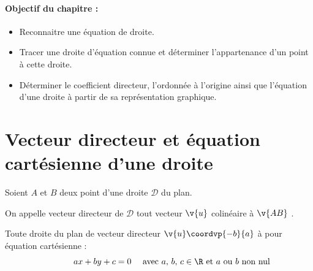 \paragraph*{Objectif du chapitre :}
\begin{itemize}
\item  Reconnaitre une équation de droite.
\item  Tracer une droite d'équation connue et déterminer l'appartenance d'un point à cette droite.
\item  Déterminer le coefficient directeur, l'ordonnée à l'origine ainsi que l'équation d'une droite à partir de sa représentation graphique.
\end{itemize}

\section{Vecteur directeur et équation cartésienne d'une droite}

\begin{defi}{}{}
Soient $A$ et $B$ deux point d'une droite $\mathcal{D}$ du plan. 

\noindent On appelle vecteur directeur de $\mathcal{D}$ tout vecteur $\v{u}$ colinéaire à $\v{AB}$ .
\end{defi}

\begin{prop}{}{}
Toute droite du plan de vecteur directeur $\v{u} \coordvp{-b}{a}$ à pour équation cartésienne : \[\quad \quad \quad ax+by+c=0 \quad \text{ avec $a$, $b$, $c \in \R$ et $a$ ou $b$ non nul}\]
\end{prop}

